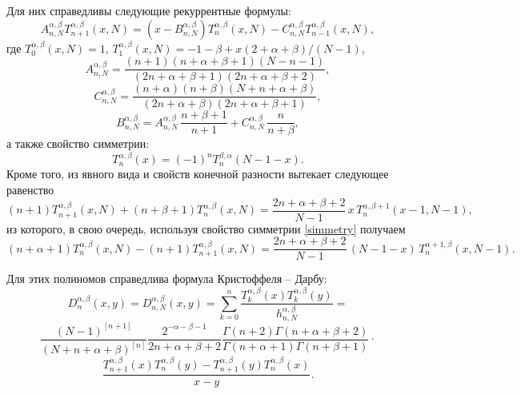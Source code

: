\documentclass[12pt]{book}
\begin{document}
Для них справедливы следующие рекуррентные формулы:
\begin{equation}\label{recur}
  A^{\alpha,\beta}_{n,N} T^{\alpha,\beta}_{n+1}(x,N) = (x-B^{\alpha,\beta}_{n,N}) T^{\alpha,\beta}_{n}(x,N) - C^{\alpha,\beta}_{n,N} T^{\alpha,\beta}_{n-1}(x,N),
\end{equation}
где $T^{\alpha,\beta}_{0}(x,N)=1$, $T^{\alpha,\beta}_{1}(x,N)=-1-\beta+x(2+\alpha+\beta)/(N-1)$,
\begin{equation*}
  A^{\alpha,\beta}_{n,N} = \frac{(n+1)(n+\alpha+\beta+1)(N-n-1)}{(2n+\alpha+\beta+1)(2n+\alpha+\beta+2)},
\end{equation*}
\begin{equation*}
  C^{\alpha,\beta}_{n,N} = \frac{(n+\alpha)(n+\beta)(N+n+\alpha+\beta)}{(2n+\alpha+\beta)(2n+\alpha+\beta+1)},
\end{equation*}
\begin{equation*}
  B^{\alpha,\beta}_{n,N} = A^{\alpha,\beta}_{n,N}\,\frac{n+\beta+1}{n+1}+C^{\alpha,\beta}_{n,N}\,\frac{n}{n+\beta},
\end{equation*}
а также свойство симметрии:
\begin{equation}\label{simmetry}
  T^{\alpha,\beta}_{n}(x) = (-1)^{n} T^{\beta, \alpha}_{n}(N-1-x).
\end{equation}
Кроме того, из явного вида и свойств конечной разности вытекает следующее равенство
\begin{equation}\label{recur1}
  (n+1) T^{\alpha,\beta}_{n+1}(x,N) + (n+\beta+1)T^{\alpha,\beta}_{n}(x,N) = \frac{2n+\alpha+\beta+2}{N-1}\,x\,T^{\alpha,\beta+1}_{n}(x-1,N-1),
\end{equation}
из которого, в свою очередь, используя свойство симметрии \eqref{simmetry} получаем
\begin{equation}\label{recur2}
  (n+\alpha+1) T^{\alpha,\beta}_{n}(x,N) - (n+1)T^{\alpha,\beta}_{n+1}(x,N) = \frac{2n+\alpha+\beta+2}{N-1}\,(N-1-x)\,T^{\alpha+1,\beta}_{n}(x,N-1).
\end{equation}





Для этих полиномов справедлива формула Кристоффеля -- Дарбу:
\begin{equation*}
  D^{\alpha,\beta}_{n} (x,y) = D^{\alpha,\beta}_{n,N} (x,y) = \sum_{k=0}^{n} \frac{T^{\alpha,\beta}_{k}(x) T^{\alpha,\beta}_{k}(y)}{h^{\alpha,\beta}_{n,N}} =
\end{equation*}
\begin{equation*}
  \frac{(N-1)^{[n+1]}}{(N+n+\alpha+\beta)^{[n]}} \frac{2^{-\alpha-\beta-1}}{2n+\alpha+\beta+2}
  \frac{\Gamma(n+2)\Gamma(n+\alpha+\beta+2)}{\Gamma(n+\alpha+1)\Gamma(n+\beta+1)} \cdot
\end{equation*}
\begin{equation}\label{kristT}
  \frac{T_{n+1}^{\alpha,\beta}(x) T_{n}^{\alpha,\beta}(y) - T_{n+1}^{\alpha,\beta}(y) T_{n}^{\alpha,\beta}(x)}{x-y}.
\end{equation}
\end{document}

